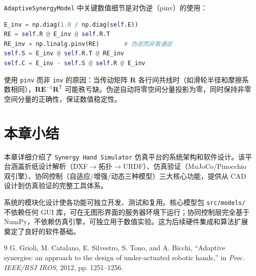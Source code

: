 \documentclass[12pt,a4paper,openany]{book}
\begin{document}
\texttt{AdaptiveSynergyModel} 中关键数值细节是对伪逆（pinv）的使用：

\begin{lstlisting}[language=Python, caption={自适应协同模型预计算核心代码}]
E_inv = np.diag(1.0 / np.diag(self.E))
RE = self.R @ E_inv @ self.R.T
RE_inv = np.linalg.pinv(RE)       # 伪逆而非普通逆
self.S = E_inv @ self.R.T @ RE_inv
self.C = E_inv - self.S @ self.R @ E_inv
\end{lstlisting}

使用 \texttt{pinv} 而非 \texttt{inv} 的原因：当传动矩阵 \(\bm{R}\) 各行间共线时（如滑轮半径和摩擦系数相同），\(\bm{R} \bm{E}^{-1} \bm{R}^{\mathsf{T}}\) 可能秩亏缺。伪逆自动将零空间分量投影为零，同时保持非零空间分量的正确性，保证数值稳定性。

\section{本章小结}

本章详细介绍了 \texttt{Synergy Hand Simulator} 仿真平台的系统架构和软件设计。该平台涵盖折纸设计解析（DXF$\rightarrow$拓扑$\rightarrow$URDF）、仿真验证（MuJoCo/Pinocchio 双引擎）、协同控制（自适应/增强/动态三种模型）三大核心功能，提供从 CAD 设计到仿真验证的完整工具体系。

系统的模块化设计使各功能可独立开发、测试和复用。核心模型包 \texttt{src/models/} 不依赖任何 GUI 库，可在无图形界面的服务器环境下运行；协同控制层完全基于 NumPy，不依赖仿真引擎，可独立用于数值实验。这为后续硬件集成和算法扩展奠定了良好的软件基础。

\begin{thebibliography}{9}
 G. Grioli, M. Catalano, E. Silvestro, S. Tono, and A. Bicchi, ``Adaptive synergies: an approach to the design of under-actuated robotic hands,'' in \textit{Proc. IEEE/RSJ IROS}, 2012, pp. 1251--1256.
\end{thebibliography}
\end{document}
